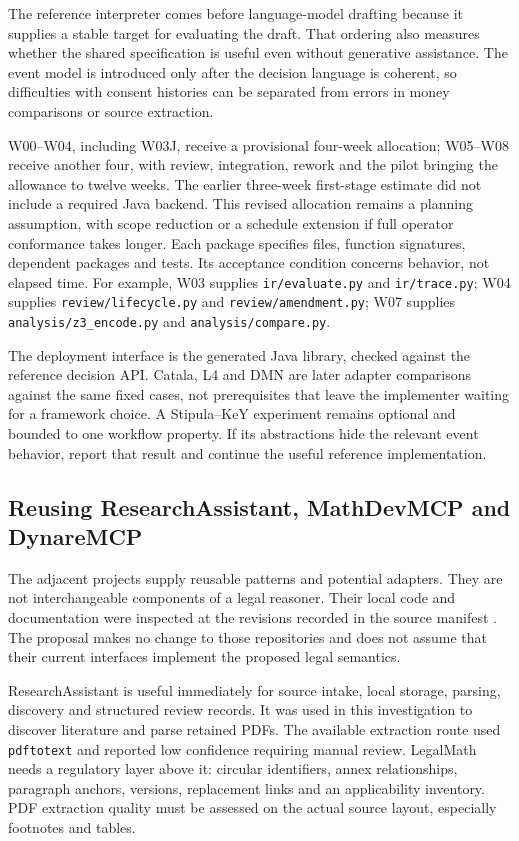 The reference interpreter comes before language-model drafting because it supplies
a stable target for evaluating the draft. That ordering also measures whether the
shared specification is useful even without generative assistance. The event
model is introduced only after the decision language is coherent, so difficulties
with consent histories can be separated from errors in money comparisons or
source extraction.

W00--W04, including W03J, receive a provisional four-week allocation; W05--W08
receive another four, with review, integration, rework and the pilot bringing
the allowance to twelve weeks. The earlier three-week first-stage estimate did
not include a required Java backend. This revised allocation remains a planning
assumption, with scope reduction or a schedule extension if full operator
conformance takes longer. Each package specifies files, function signatures, dependent
packages and tests. Its acceptance condition concerns behavior, not elapsed time.
For example, W03 supplies \texttt{ir/evaluate.py} and \texttt{ir/trace.py}; W04
supplies \texttt{review/lifecycle.py} and \texttt{review/amendment.py}; W07
supplies \texttt{analysis/z3\_encode.py} and \texttt{analysis/compare.py}.

The deployment interface is the generated Java library, checked against the
reference decision API. Catala, L4 and DMN
are later adapter comparisons against the same fixed cases, not prerequisites
that leave the implementer waiting for a framework choice. A Stipula--KeY
experiment remains optional and bounded to one workflow property. If its
abstractions hide the relevant event behavior, report that result and continue
the useful reference implementation.

\subsection{Reusing ResearchAssistant, MathDevMCP and DynareMCP}

The adjacent projects supply reusable patterns and potential adapters. They are
not interchangeable components of a legal reasoner. Their local code and
documentation were inspected at the revisions recorded in the source manifest
\citep{localrepos}. The proposal makes no change to those repositories and does
not assume that their current interfaces implement the proposed legal semantics.

ResearchAssistant is useful immediately for source intake, local storage, parsing,
discovery and structured review records. It was used in this investigation to
discover literature and parse retained PDFs. The available extraction route used
\texttt{pdftotext} and reported low confidence requiring manual review. LegalMath
needs a regulatory layer above it: circular identifiers, annex relationships,
paragraph anchors, versions, replacement links and an applicability inventory.
PDF extraction quality must be assessed on the actual source layout, especially
footnotes and tables.


